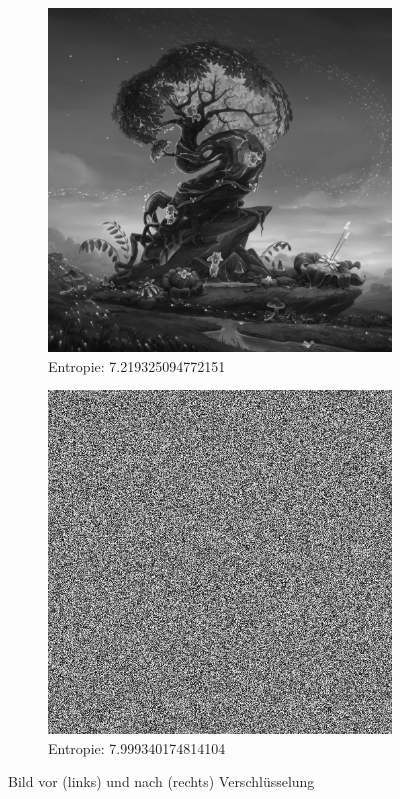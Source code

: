 \begin{figure}
	\centering

	\begin{subfigure}{0.35\textwidth}
		\includegraphics[width=\textwidth]{../1/3/gray_7.2193250947721515_fantasy_tree.jpg}
		\caption{Entropie: 7.219325094772151}
	\end{subfigure}
	\hfill
	\begin{subfigure}{0.35\textwidth}
		\includegraphics[width=\textwidth]{../1/3/encrypted_7.999340174814104_fantasy_tree.jpg}
		\caption{Entropie: 7.999340174814104}
	\end{subfigure}

	\caption{Bild vor (links) und nach (rechts) Verschlüsselung}
	\label{fig:fantasy}
\end{figure}

